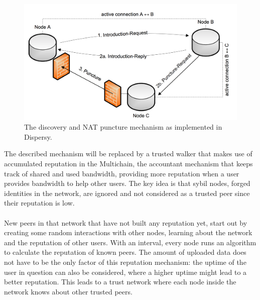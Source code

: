 \begin{figure}[h!]
	\centering
	\includegraphics[width=0.7\columnwidth]{images/architecture/dispersy_discover}
	\caption{The discovery and NAT puncture mechanism as implemented in Dispersy.}
	\label{fig:dispersy-discover}
\end{figure}

The described mechanism will be replaced by a trusted walker that makes use of accumulated reputation in the Multichain, the accountant mechanism that keeps track of shared and used bandwidth, providing more reputation when a user provides bandwidth to help other users. The key idea is that sybil nodes, forged identities in the network, are ignored and not considered as a trusted peer since their reputation is low.\\\\
New peers in that network that have not built any reputation yet, start out by creating some random interactions with other nodes, learning about the network and the reputation of other users. With an interval, every node runs an algorithm to calculate the reputation of known peers. The amount of uploaded data does not have to be the only factor of this reputation mechanism: the uptime of the user in question can also be considered, where a higher uptime might lead to a better reputation. This leads to a trust network where each node inside the network knows about other trusted peers.\\\\

